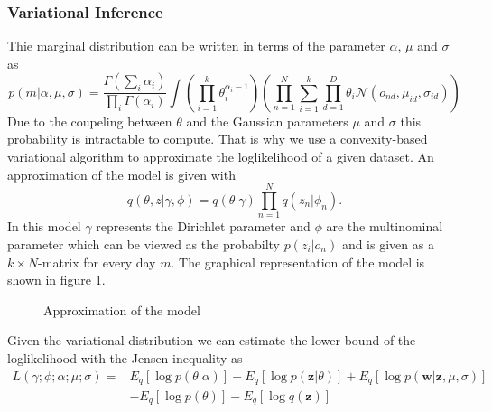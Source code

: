 \documentclass[11pt,a4paper]{article}
\begin{document}
  
  \subsubsection{Variational Inference}
 
  Thie marginal distribution can be written in terms of the parameter $\alpha$, $\mu$ and $\sigma$ as
  \begin{equation}
   p(m|\alpha,\mu,\sigma) = \frac{\Gamma (\sum_i \alpha_i)}{\prod_i \Gamma(\alpha_i)} \int \left( \prod_{i=1}^k \theta_i^{\alpha_i-1} \right)
   \left( \prod_{n=1}^N \sum_{i=1}^k \prod_{d=1}^D \theta_i \mathcal{N}(o_{nd},\mu_{id},\sigma_{id} ) \right)
  \end{equation}
  Due to the coupeling between $\theta$ and the Gaussian parameters $\mu$ and $\sigma$ this probability is intractable to compute. That is why we use a convexity-based variational algorithm to approximate the loglikelihood of a given dataset. 
  An approximation of the model is given with 
  \begin{equation}
   q(\theta,z|\gamma,\phi) = q(\theta|\gamma) \prod_{n=1}^N q(z_n|\phi_n).
  \end{equation}
  In this model $\gamma$ represents the Dirichlet parameter and $\phi$ are the multinominal parameter which can be viewed as the probabilty $p(z_i|o_n)$ and is given as a $k \times N$-matrix for every day $m$. The graphical representation of the model is shown in figure \ref{fig:ModelApprox}.
  
  
\begin{figure}[t!]
\centering
\def\svgwidth{0.4\textwidth}

\caption{Approximation of the model}
\label{fig:ModelApprox}
\end{figure}
  
  
  
  
  Given the variational distribution we can estimate the lower bound of the loglikelihood with the Jensen inequality as
  \begin{equation}
   \begin{split}
    L(\gamma;\phi;\alpha;\mu;\sigma) =& E_q[\log p(\theta|\alpha)] + E_q[\log p(\textbf{z}|\theta)] + E_q[\log p(\textbf{w}|\textbf{z},\mu,\sigma)] \\
   & -E_q[\log p(\theta)] - E_q[\log q(\textbf{z})]
   \end{split}
  \end{equation}
\end{document}
